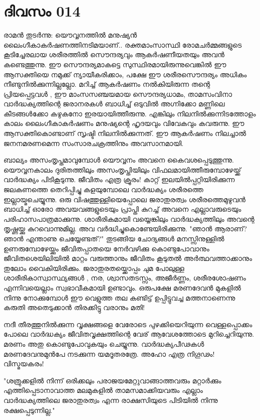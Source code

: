 \newpage
\section{ദിവസം 014}


രാമന്‍ തുടര്‍ന്നു: യൌവ്വനത്തില്‍ മനുഷ്യന്‍ ലൈംഗീകാകര്‍ഷണത്തിനടിമയാണ്‌..  രക്തമാംസാസ്ഥി രോമചര്‍മ്മങ്ങളുടെ കൂടിച്ചേരലായ ശരീരത്തില്‍ സൌന്ദര്യവും ആകര്‍ഷണീയതയും അവന്‍ കണ്ടെത്തുന്നു. ഈ സൌന്ദര്യമാകട്ടെ സുസ്ഥിരമായിരുന്നുവെങ്കില്‍ ഈ ആസക്തിയെ നമുക്ക്‌ ന്യായീകരിക്കാം, പക്ഷേ ഈ ശരീരസൌന്ദര്യം അധികം നീണ്ടുനില്‍ക്കുന്നില്ലല്ലോ. മറിച്ച്‌ ആകര്‍ഷണം നല്‍കിയിരുന്ന തന്റെ പ്രിയപ്പെട്ടവള്‍ , ഈ മാംസസഞ്ചയമായ സൌന്ദര്യധാമം, താമസംവിനാ വാര്‍ദ്ധക്യത്തിന്റെ ജരാനരകള്‍ ബാധിച്ച്‌ ഒടുവില്‍ അഗ്നിക്കോ മണ്ണിലെ കീടങ്ങള്‍ക്കോ കഴുകനോ ഇരയായിത്തീരുന്നു. എങ്കിലും നിലനില്‍ക്കുന്നിടത്തോളം കാലം ലൈംഗീകാകര്‍ഷണം മനുഷ്യന്റെ ഹൃദയവും വിവേകവും കവരുന്നു. ഈ ആസക്തികൊണ്ടാണ്‌ സൃഷ്ടി നിലനില്‍ക്കുന്നത്‌. ഈ ആകര്‍ഷണം നിലച്ചാല്‍ ജനനമരണമെന്ന സംസാരചക്രത്തിനും അവസാനമായി.

ബാല്യം അസംതൃപ്തമാവുമ്പോള്‍ യൌവ്വനം അവനെ കൈവശപ്പെടുത്തുന്നു. യൌവ്വനകാലം ദുരിതത്തിലും അസംതൃപ്തിയിലും വിഫലമായിത്തീരുമ്പോഴേയ്ക്ക്‌ വാര്‍ദ്ധക്യം പിടികൂടുന്നു. ജീവിതം എത്ര ക്രൂരം! കാറ്റ്‌ ഇലയില്‍പ്പറ്റിയിരിക്കുന്ന ജലകണത്തെ തെറിപ്പിച്ചു കളയുമ്പോലെ വാര്‍ദ്ധക്യം ശരീരത്തെ ഇല്ലായ്മചെയ്യുന്നു. ഒരു വിഷത്തുള്ളിയെപ്പോലെ ജരാതുരത്വം ശരീരത്തെമുഴുവന്‍ ബാധിച്ച്‌ ഓരോ അവയവങ്ങളുടെയും പ്രാപ്തി കുറച്ച്‌ അവനെ എല്ലാവരുടെയും പരിഹാസപാത്രമാക്കുന്നു. ശാരീരികമായി വയ്യെങ്കിലും വാര്‍ദ്ധക്യത്തിലും അവന്റെ തൃഷ്ണയ്ക്കു കുറവൊന്നുമില്ല. അവ വര്‍ദ്ധിച്ചുകൊണ്ടേയിരിക്കുന്നു. "ഞാന്‍ ആരാണ്‌? ഞാന്‍ എന്താണു ചെയ്യേണ്ടത്‌?" തുടങ്ങിയ ചോദ്യങ്ങള്‍ മനസ്സിനുള്ളില്‍ ഉണരുമ്പോഴേയ്ക്കും ജീവിതപ്പാതയെ നേര്‍വഴിക്കു കൊണ്ടുപോവാനും ജീവിതശെയിലിയില്‍ മാറ്റം വരുത്താനും ജീവിതം കൂടുതല്‍ അര്‍ത്ഥവത്താക്കാനും തുലോം വൈകിയിരിക്കും. ജരാതുരതയ്ക്കൊപ്പം ചുമ പോലുള്ള ശാരീരികാസ്വാസ്ഥ്യങ്ങള്‍ , നര, ശ്വാസതടസ്സം, അജീര്‍ണ്ണം, ശരീരശോഷണം എന്നിവയെല്ലാം സ്വഭാവീകമായി ഉണ്ടാവും. ഒരുപക്ഷേ മരണദേവന്‍ മുകളില്‍ നിന്നു നോക്കുമ്പോള്‍ ഈ വെളുത്ത തല കണ്ടിട്ട്‌ ഉപ്പിട്ടുവച്ച മത്തനാണെന്നു കരുതി അതെടുക്കാന്‍ തിരക്കിട്ടു വരാനും മതി!

നദീ തീരത്തുനില്‍ക്കുന്ന വൃക്ഷങ്ങളെ വേരോടെ പുഴക്കിയെറിയുന്ന വെള്ളപ്പൊക്കം പോലെ വാര്‍ദ്ധക്യം ജീവിതവൃക്ഷത്തിന്റെ വേര്‌ ആവേശത്തോടെ മുറിച്ചെറിയുന്നു. മരണം അതു കൊണ്ടുപോവുകയും ചെയ്യുന്നു. വാര്‍ദ്ധക്യപീഢകള്‍ മരണദേവനുമുന്‍പേ നടക്കുന്ന യമദൂതരത്രേ. അഹോ എത്ര നിഗൂഢം! വിസ്മയകരം!

"ശത്രുക്കളില്‍ നിന്ന് ഒരിക്കലും പരാജയമേറ്റുവാങ്ങാത്തവരും മറ്റാര്‍ക്കും എത്തിപ്പെടാനാവാത്ത മലമുകളില്‍ താമസമാക്കിയവരും എല്ലാം വാര്‍ദ്ധക്യത്തിലെ ജരാതുരത്വം എന്ന രാക്ഷസിയുടെ പിടിയില്‍ നിന്നു രക്ഷപ്പെടുന്നില്ല."
